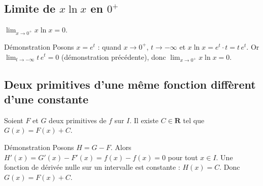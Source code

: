 \documentclass[11pt,a4paper,openany]{book}
\theoremstyle{definition}
\begin{document}
    \subsection{Limite de $x\ln x$ en $0^+$}

    \begin{enoncebox}
    $\lim_{x\to 0^+}x\ln x=0$.
    \end{enoncebox}

    \begin{methodebox}{Démonstration}
    Posons $x=e^t$ : quand $x\to 0^+$, $t\to-\infty$ et $x\ln x=e^t\cdot t=t\,e^t$.
    Or $\lim_{t\to-\infty}t\,e^t=0$ (démonstration précédente), donc $\lim_{x\to 0^+}x\ln x=0$.
    \end{methodebox}

    \subsection{Deux primitives d'une même fonction diffèrent d'une constante}

    \begin{enoncebox}
    Soient $F$ et $G$ deux primitives de $f$ sur $I$. Il existe $C\in\mathbf{R}$ tel que $G(x)=F(x)+C$.
    \end{enoncebox}

    \begin{methodebox}{Démonstration}
    Posons $H=G-F$. Alors $H'(x)=G'(x)-F'(x)=f(x)-f(x)=0$ pour tout $x\in I$.
    Une fonction de dérivée nulle sur un intervalle est constante : $H(x)=C$.
    Donc $G(x)=F(x)+C$.
    \end{methodebox}
\end{document}
